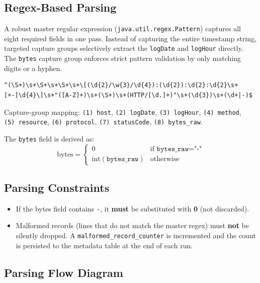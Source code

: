\documentclass[11pt,a4paper]{article}
\begin{document}
\subsection{Regex-Based Parsing}

A robust master regular expression (\texttt{java.util.regex.Pattern}) captures all eight required fields in one pass. Instead of capturing the entire timestamp string, targeted capture groups selectively extract the \texttt{logDate} and \texttt{logHour} directly. The \texttt{bytes} capture group enforces strict pattern validation by only matching digits or a hyphen.

\begin{lstlisting}[style=regexstyle, caption={Master regular expression for log-line parsing}]
^(\S+)\s+\S+\s+\S+\s+\[(\d{2}/\w{3}/\d{4}):(\d{2}):\d{2}:\d{2}\s+[+-]\d{4}\]\s+"([A-Z]+)\s+(\S+)\s+(HTTP/[\d.]+)"\s+(\d{3})\s+(\d+|-)$
\end{lstlisting}

Capture-group mapping:
\texttt{(1)~host}, \texttt{(2)~logDate}, \texttt{(3)~logHour}, \texttt{(4)~method},
\texttt{(5)~resource}, \texttt{(6)~protocol}, \texttt{(7)~statusCode},
\texttt{(8)~bytes\_raw}.

The \texttt{bytes} field is derived as:
\[
  \text{bytes} =
  \begin{cases}
    0 & \text{if } \texttt{bytes\_raw} = \texttt{"-"} \\
    \text{int}(\texttt{bytes\_raw}) & \text{otherwise}
  \end{cases}
\]

\subsection{Parsing Constraints}

\begin{constraintbox}
\begin{itemize}
  \item If the bytes field contains \texttt{-}, it \textbf{must} be substituted with \textbf{0} (not discarded).
  \item Malformed records (lines that do not match the master regex) must \textbf{not} be silently dropped. A \texttt{malformed\_record\_counter} is incremented and the count is persisted to the metadata table at the end of each run.
\end{itemize}
\end{constraintbox}
\newpage
\subsection{Parsing Flow Diagram}
\end{document}
